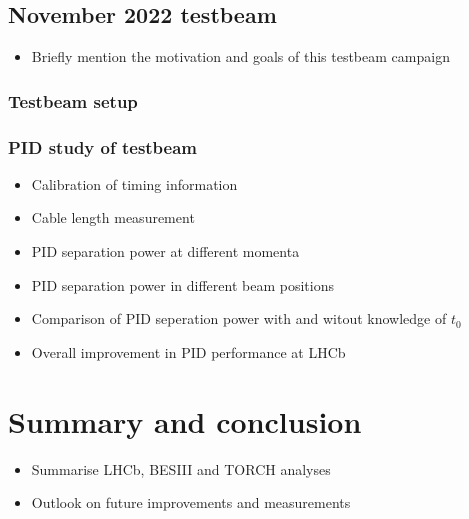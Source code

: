 \documentclass[12pt, a4paper, notitlepage, onecolumn]{article}
\begin{document}
\subsection{November 2022 testbeam}
  \begin{itemize}[nosep]
    \setlength{\itemindent}{2em}
    \item[\textendash]{Briefly mention the motivation and goals of this testbeam campaign}
  \end{itemize}
\subsubsection{Testbeam setup}
\subsubsection{PID study of testbeam}
  \begin{itemize}[nosep]
    \setlength{\itemindent}{2.5em}
    \item[\textasteriskcentered]{Calibration of timing information}
    \item[\textasteriskcentered]{Cable length measurement}
    \item[\textasteriskcentered]{PID separation power at different momenta}
    \item[\textasteriskcentered]{PID separation power in different beam positions}
    \item[\textasteriskcentered]{Comparison of PID seperation power with and witout knowledge of $t_0$}
    \item[\textasteriskcentered]{Overall improvement in PID performance at LHCb}
  \end{itemize}

\section{Summary and conclusion}
  \begin{itemize}[nosep]
    \setlength{\itemindent}{0em}
    \item{Summarise LHCb, BESIII and TORCH analyses}
    \item{Outlook on future improvements and measurements}
  \end{itemize}
\end{document}
